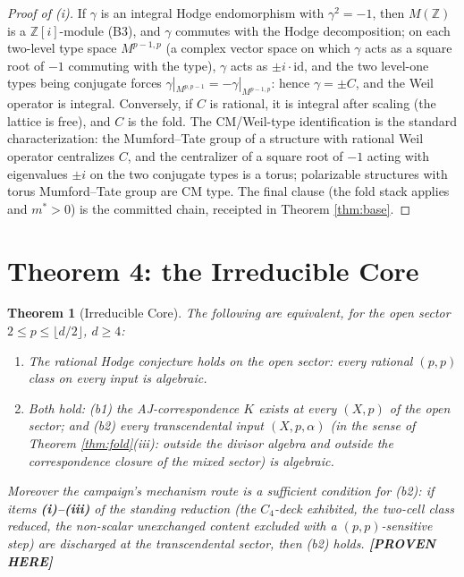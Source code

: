 \documentclass[11pt]{article}
\newtheorem{theorem}{Theorem}
\newcommand{\PROVEN}{\textbf{[PROVEN HERE]}}
\newcommand{\Z}{\mathbb{Z}}
\begin{document}
\begin{proof}[Proof of (i)]
If $\gamma$ is an integral Hodge endomorphism with $\gamma^2=-1$, then
$M(\Z)$ is a $\Z[i]$-module (B3), and $\gamma$ commutes with the Hodge
decomposition; on each two-level type space $M^{p-1,p}$ (a complex vector
space on which $\gamma$ acts as a square root of $-1$ commuting with the
type), $\gamma$ acts as $\pm i\cdot\mathrm{id}$, and the two level-one types
being conjugate forces $\gamma|_{M^{p,p-1}}=-\gamma|_{M^{p-1,p}}$: hence
$\gamma=\pm C$, and the Weil operator is integral. Conversely, if $C$ is
rational, it is integral after scaling (the lattice is free), and $C$ is the
fold. The CM/Weil-type identification is the standard characterization: the
Mumford--Tate group of a structure with rational Weil operator centralizes
$C$, and the centralizer of a square root of $-1$ acting with eigenvalues
$\pm i$ on the two conjugate types is a torus; polarizable structures with
torus Mumford--Tate group are CM type. The final clause (the fold stack
applies and $m^*>0$) is the committed chain, receipted in Theorem
\ref{thm:base}.
\end{proof}

\section{Theorem 4: the Irreducible Core}

\begin{theorem}[Irreducible Core]\label{thm:core}
The following are equivalent, for the open sector
$2\le p\le\lfloor d/2\rfloor$, $d\ge4$:
\begin{enumerate}[label=(\alph*)]
\item The rational Hodge conjecture holds on the open sector: every rational
$(p,p)$ class on every input is algebraic.
\item Both hold: \emph{(b1)} the AJ-correspondence $K$ exists at every
$(X,p)$ of the open sector; and \emph{(b2)} every transcendental input
$(X,p,\alpha)$ (in the sense of Theorem \ref{thm:fold}(iii): outside the
divisor algebra and outside the correspondence closure of the mixed sector)
is algebraic.
\end{enumerate}
Moreover the campaign's mechanism route is a sufficient condition for (b2):
if items \textbf{(i)--(iii)} of the standing reduction (the $C_4$-deck
exhibited, the two-cell class reduced, the non-scalar unexchanged content
excluded with a $(p,p)$-sensitive step) are discharged at the transcendental
sector, then (b2) holds.
\PROVEN{}
\end{theorem}
\end{document}
